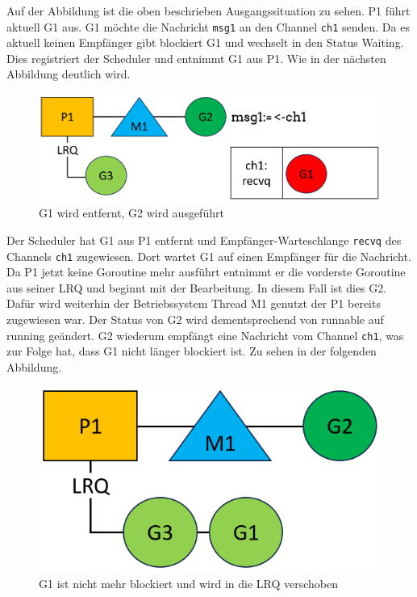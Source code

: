 \documentclass[fontsize=12pt,paper=a4,twoside=semi,parskip=half-,headsepline,headinclude]{scrreprt}
\begin{document}
Auf der Abbildung ist die oben beschrieben Ausgangssituation zu sehen. P1 führt aktuell G1 aus. G1 möchte die Nachricht \texttt{msg1} an den Channel \texttt{ch1} senden. Da es aktuell keinen Empfänger gibt blockiert G1 und wechselt in den Status Waiting. Dies registriert der Scheduler und entnimmt G1 aus P1. Wie in der nächsten Abbildung deutlich wird.

\begin{figure}[h]
	\centering
	\includegraphics[scale=0.5]{figures/GoroutineChannel2.png}
	\caption{G1 wird entfernt, G2 wird ausgeführt}
	\label{fig:GoroutineChannel2}
\end{figure}

Der Scheduler hat G1 aus P1 entfernt und Empfänger-Warteschlange \texttt{recvq} des Channels \texttt{ch1} zugewiesen. Dort wartet G1 auf einen Empfänger für die Nachricht. Da P1 jetzt keine Goroutine mehr ausführt entnimmt er die vorderste Goroutine aus seiner LRQ und beginnt mit der Bearbeitung. In diesem Fall ist dies G2. Dafür wird weiterhin der Betriebssystem Thread M1 genutzt der P1 bereits zugewiesen war. Der Status von G2 wird dementsprechend von runnable auf running geändert. G2 wiederum empfängt eine Nachricht vom Channel \texttt{ch1}, was zur Folge hat, dass G1 nicht länger blockiert ist. Zu sehen in der folgenden Abbildung.

\begin{figure}[h]
	\centering
	\includegraphics[scale=0.5]{figures/GoroutineChannel3.png}
	\caption{G1 ist nicht mehr blockiert und wird in die LRQ verschoben}
	\label{fig:GoroutineChannel3}
\end{figure}
\end{document}
